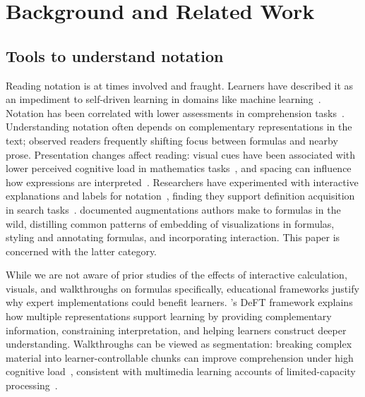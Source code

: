\section{Background and Related Work}


\subsection{Tools to understand notation}

Reading notation is at times involved and fraught. Learners have described it as an impediment to self-driven learning in domains like machine learning~\cite{Cai2019-lb}. Notation has been correlated with lower assessments in comprehension tasks~\cite{Osterholm2006-al}. Understanding notation often depends on complementary representations in the text; \citet{Kohlhase2018-vv} observed readers frequently shifting focus between formulas and nearby prose. Presentation changes affect reading: visual cues have been associated with lower perceived cognitive load in mathematics tasks~\cite{5c7148d6-681c-3534-885c-7936f89f5133}, and spacing can influence how expressions are interpreted~\cite{Landy2007-zk}. Researchers have experimented with interactive explanations and labels for notation~\cite{Head2020-eg,ref:alcock2011eproofs,crichton2021newmedium,ref:li2022heartdown,Chulpongsatorn_2023,Gunturu_2024}, finding they support definition acquisition in search tasks~\cite{Head2020-eg}. \citet{Head2022-ws} documented augmentations authors make to formulas in the wild, distilling common patterns of embedding of visualizations in formulas, styling and annotating formulas, and incorporating interaction. This paper is concerned with the latter category.

While we are not aware of prior studies of the effects of interactive calculation, visuals, and walkthroughs on formulas specifically, educational frameworks justify why expert implementations could benefit learners. \citet{Ainsworth2006-pu}'s DeFT framework explains how multiple representations support learning by providing complementary information, constraining interpretation, and helping learners construct deeper understanding. Walkthroughs can be viewed as segmentation: breaking complex material into learner-controllable chunks can improve comprehension under high cognitive load~\cite{Plass2009-sq}, consistent with multimedia learning accounts of limited-capacity processing~\cite{mayer2001multimedia}.

